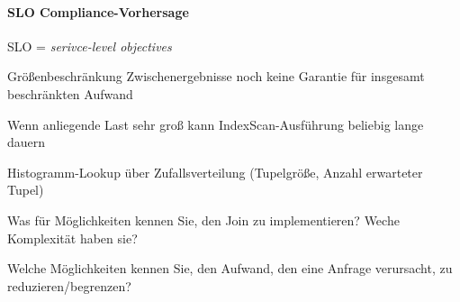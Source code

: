 \paragraph{SLO Compliance-Vorhersage}
\begin{items}
	\item SLO = \emph{serivce-level objectives}
	\item Größenbeschränkung Zwischenergebnisse noch keine Garantie für insgesamt beschränkten Aufwand
	\item Wenn anliegende Last sehr groß kann IndexScan-Ausführung beliebig lange dauern
	\item Histogramm-Lookup über Zufallsverteilung (Tupelgröße, Anzahl erwarteter Tupel)
\end{items}

\begin{fragen}
	\item Was für Möglichkeiten kennen Sie, den Join zu implementieren? Weche Komplexität haben sie?
	\item Welche Möglichkeiten kennen Sie, den Aufwand, den eine Anfrage verursacht, zu reduzieren/begrenzen?
\end{fragen}